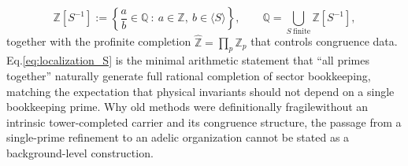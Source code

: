 \documentclass[11pt]{article}
\theoremstyle{remark}
\newcommand{\Z}{\mathbb{Z}}
\newcommand{\Q}{\mathbb{Q}}
\begin{document}
\begin{equation}\label{eq:localization_S}
\Z[S^{-1}]:=\left\{\frac{a}{b}\in\Q\ :\ a\in\Z,\ b\in\langle S\rangle\right\},\qquad \Q=\bigcup_{S\ \mathrm{finite}}\Z[S^{-1}],
\end{equation}
together with the profinite completion \(\widehat{\Z}=\prod_{p}\Z_{p}\) that controls congruence data. Eq.\eqref{eq:localization_S} is the minimal arithmetic statement that ``all primes together'' naturally generate full rational completion of sector bookkeeping, matching the expectation that physical invariants should not depend on a single bookkeeping prime. Why old methods were definitionally fragile\:without an intrinsic tower-completed carrier and its congruence structure, the passage from a single-prime refinement to an adelic organization cannot be stated as a background-level construction.
\end{document}
